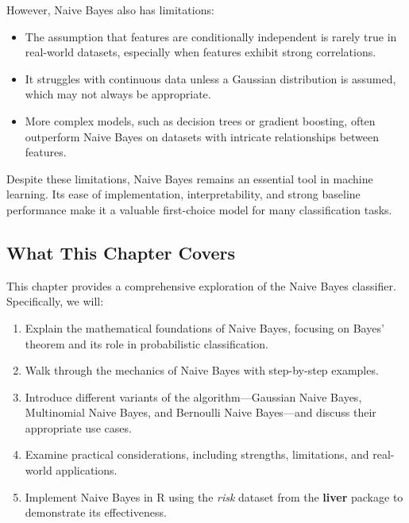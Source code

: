 \documentclass[
]{book}
\providecommand{\tightlist}{%
  \setlength{\itemsep}{0pt}\setlength{\parskip}{0pt}}
\theoremstyle{definition}
\theoremstyle{definition}
\theoremstyle{definition}
\theoremstyle{definition}
\theoremstyle{remark}
\begin{document}
However, Naive Bayes also has limitations:

\begin{itemize}
\tightlist
\item
  The assumption that features are conditionally independent is rarely true in real-world datasets, especially when features exhibit strong correlations.\\
\item
  It struggles with continuous data unless a Gaussian distribution is assumed, which may not always be appropriate.\\
\item
  More complex models, such as decision trees or gradient boosting, often outperform Naive Bayes on datasets with intricate relationships between features.
\end{itemize}

Despite these limitations, Naive Bayes remains an essential tool in machine learning. Its ease of implementation, interpretability, and strong baseline performance make it a valuable first-choice model for many classification tasks.

\subsection*{What This Chapter Covers}\label{what-this-chapter-covers}

This chapter provides a comprehensive exploration of the Naive Bayes classifier. Specifically, we will:

\begin{enumerate}
\def\labelenumi{\arabic{enumi}.}
\tightlist
\item
  Explain the mathematical foundations of Naive Bayes, focusing on Bayes' theorem and its role in probabilistic classification.\\
\item
  Walk through the mechanics of Naive Bayes with step-by-step examples.\\
\item
  Introduce different variants of the algorithm---Gaussian Naive Bayes, Multinomial Naive Bayes, and Bernoulli Naive Bayes---and discuss their appropriate use cases.\\
\item
  Examine practical considerations, including strengths, limitations, and real-world applications.\\
\item
  Implement Naive Bayes in R using the \emph{risk} dataset from the \textbf{liver} package to demonstrate its effectiveness.
\end{enumerate}
\end{document}
